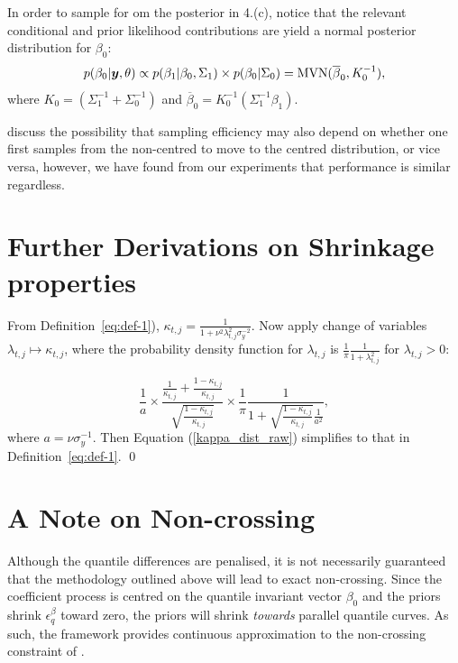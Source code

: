 %
In order to sample for om the posterior in  4.(c), notice that the relevant conditional and prior likelihood contributions are yield a normal posterior distribution for $\beta_0$:
%
\begin{equation}
    p(\beta_0|\boldsymbol{y},\theta) \propto p(\beta_1|\beta_0,\Sigma_1) \times p(\beta_0 | \Sigma_0) = \mathrm{MVN}(\overline{\beta}_0,K^{-1}_0),
\end{equation}
where $K_0 = (\Sigma^{-1}_1 + \Sigma^{-1}_0)$ and $\overline{\beta}_0 = K^{-1}_0(\Sigma^{-1}_1\beta_1)$.
%

%
\citet{bitto2019achieving} discuss the possibility that sampling efficiency may also depend on whether one first samples from the non-centred to move to the centred distribution, or vice versa, however, we have found from our experiments that performance is similar regardless. 
%

\section{Further Derivations on Shrinkage properties}\label{sec:shrinkage-properties}
%
From Definition~\ref{eq:def-1}), $\kappa_{t,j} = \frac{1}{1 + \nu^2\lambda_{t,j}^2 \sigma^{-2}_y}$. Now apply change of variables $\lambda_{t,j} \mapsto \kappa_{t,j}$, where the probability density function for $\lambda_{t,j}$ is $\frac{1}{\pi} \frac{1}{1 + \lambda_{t,j}^2}$ for $\lambda_{t,j} > 0$: 

\begin{equation} \label{kappa_dist_raw}
    \frac{1}{a} \times \frac{\frac{1}{\kappa_{t,j}} + \frac{1- \kappa_{t,j}}{\kappa_{t,j}} }{\sqrt{\frac{1- \kappa_{t,j}}{\kappa_{t,j}}}} \times \frac{1}{\pi} \frac{1}{1 + \sqrt{\frac{1- \kappa_{t,j}}{\kappa_{t,j}}} \frac{1}{a^2}},
\end{equation}
where $a = \nu \sigma^{-1}_y$. Then Equation (\ref{kappa_dist_raw}) simplifies to that in Definition~\ref{eq:def-1}. \qed{}

\section{A Note on Non-crossing}\label{app:note}
Although the quantile differences are penalised, it is not necessarily guaranteed that the methodology outlined above will lead to exact non-crossing. Since the coefficient process is centred on the quantile invariant vector $\beta_0$ and the priors shrink $\epsilon_q^{\beta}$ toward zero, the priors will shrink \textit{towards} parallel quantile curves. As such, the framework provides continuous approximation to the non-crossing constraint of \citet{bondell2010noncrossing}. 

